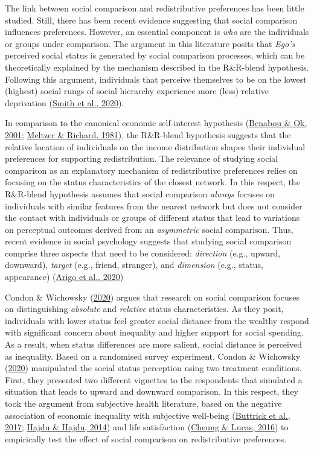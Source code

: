 \documentclass[
  12pt,
]{book}
\begin{document}
The link between social comparison and redistributive preferences has been little studied. Still, there has been recent evidence suggesting that social comparison influences preferences. However, an essential component is \emph{who} are the individuals or groups under comparison. The argument in this literature posits that \emph{Ego's} perceived social status is generated by social comparison processes, which can be theoretically explained by the mechanism described in the R\&R-blend hypothesis. Following this argument, individuals that perceive themselves to be on the lowest (highest) social rungs of social hierarchy experience more (less) relative deprivation (\protect\hyperlink{ref-Smith-eta2020_relative-deprivation}{Smith et al., 2020}).

In comparison to the canonical economic self-interest hypothesis (\protect\hyperlink{ref-Benabou2001}{Benabou \& Ok, 2001}; \protect\hyperlink{ref-Meltzer1981}{Meltzer \& Richard, 1981}), the R\&R-blend hypothesis suggests that the relative location of individuals on the income distribution shapes their individual preferences for supporting redistribution. The relevance of studying social comparison as an explanatory mechanism of redistributive preferences relies on focusing on the status characteristics of the closest network. In this respect, the R\&R-blend hypothesis assumes that social comparison \emph{always} focuses on individuals with similar features from the nearest network but does not consider the contact with individuals or groups of different status that lead to variations on perceptual outcomes derived from an \emph{asymmetric} social comparison. Thus, recent evidence in social psychology suggests that studying social comparison comprise three aspects that need to be considered: \emph{direction} (e.g., upward, downward), \emph{target} (e.g., friend, stranger), and \emph{dimension} (e.g., status, appearance) (\protect\hyperlink{ref-arigo_methods_2020}{Arigo et al., 2020})

Condon \& Wichowsky (\protect\hyperlink{ref-Condon2020}{2020}) argues that research on social comparison focuses on distinguishing \emph{absolute} and \emph{relative} status characteristics. As they posit, individuals with lower status feel greater social distance from the wealthy respond with significant concern about inequality and higher support for social spending. As a result, when status differences are more salient, social distance is perceived as inequality. Based on a randomised survey experiment, Condon \& Wichowsky (\protect\hyperlink{ref-Condon2020}{2020}) manipulated the social status perception using two treatment conditions. First, they presented two different vignettes to the respondents that simulated a situation that leads to upward and downward comparison. In this respect, they took the argument from subjective health literature, based on the negative association of economic inequality with subjective well-being (\protect\hyperlink{ref-Buttrick-etal_2017}{Buttrick et al., 2017}; \protect\hyperlink{ref-Hajdu2014}{Hajdu \& Hajdu, 2014}) and life satisfaction (\protect\hyperlink{ref-CheungLucas2014}{Cheung \& Lucas, 2016}) to empirically test the effect of social comparison on redistributive preferences.
\end{document}
